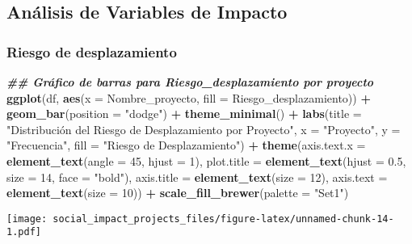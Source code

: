 \documentclass[
]{article}
\newenvironment{Shaded}{\begin{snugshade}}{\end{snugshade}}
\newcommand{\AttributeTok}[1]{\textcolor[rgb]{0.13,0.29,0.53}{#1}}
\newcommand{\DecValTok}[1]{\textcolor[rgb]{0.00,0.00,0.81}{#1}}
\newcommand{\DocumentationTok}[1]{\textcolor[rgb]{0.56,0.35,0.01}{\textbf{\textit{#1}}}}
\newcommand{\FloatTok}[1]{\textcolor[rgb]{0.00,0.00,0.81}{#1}}
\newcommand{\FunctionTok}[1]{\textcolor[rgb]{0.13,0.29,0.53}{\textbf{#1}}}
\newcommand{\NormalTok}[1]{#1}
\newcommand{\SpecialCharTok}[1]{\textcolor[rgb]{0.81,0.36,0.00}{\textbf{#1}}}
\newcommand{\StringTok}[1]{\textcolor[rgb]{0.31,0.60,0.02}{#1}}
\begin{document}
\subsection{\texorpdfstring{\textbf{Análisis de Variables de
Impacto}}{Análisis de Variables de Impacto}}\label{anuxe1lisis-de-variables-de-impacto}

\subsubsection{\texorpdfstring{\textbf{Riesgo de
desplazamiento}}{Riesgo de desplazamiento}}\label{riesgo-de-desplazamiento}

\begin{Shaded}
\begin{Highlighting}[]
\DocumentationTok{\#\# Gráfico de barras para Riesgo\_desplazamiento por proyecto}
\FunctionTok{ggplot}\NormalTok{(df, }\FunctionTok{aes}\NormalTok{(}\AttributeTok{x =}\NormalTok{ Nombre\_proyecto, }\AttributeTok{fill =}\NormalTok{ Riesgo\_desplazamiento)) }\SpecialCharTok{+}
  \FunctionTok{geom\_bar}\NormalTok{(}\AttributeTok{position =} \StringTok{"dodge"}\NormalTok{) }\SpecialCharTok{+}
  \FunctionTok{theme\_minimal}\NormalTok{() }\SpecialCharTok{+}
  \FunctionTok{labs}\NormalTok{(}\AttributeTok{title =} \StringTok{"Distribución del Riesgo de Desplazamiento por Proyecto"}\NormalTok{,}
       \AttributeTok{x =} \StringTok{"Proyecto"}\NormalTok{, }\AttributeTok{y =} \StringTok{"Frecuencia"}\NormalTok{, }\AttributeTok{fill =} \StringTok{"Riesgo de Desplazamiento"}\NormalTok{) }\SpecialCharTok{+}
  \FunctionTok{theme}\NormalTok{(}\AttributeTok{axis.text.x =} \FunctionTok{element\_text}\NormalTok{(}\AttributeTok{angle =} \DecValTok{45}\NormalTok{, }\AttributeTok{hjust =} \DecValTok{1}\NormalTok{), }
        \AttributeTok{plot.title =} \FunctionTok{element\_text}\NormalTok{(}\AttributeTok{hjust =} \FloatTok{0.5}\NormalTok{, }\AttributeTok{size =} \DecValTok{14}\NormalTok{, }\AttributeTok{face =} \StringTok{"bold"}\NormalTok{),}
        \AttributeTok{axis.title =} \FunctionTok{element\_text}\NormalTok{(}\AttributeTok{size =} \DecValTok{12}\NormalTok{),}
        \AttributeTok{axis.text =} \FunctionTok{element\_text}\NormalTok{(}\AttributeTok{size =} \DecValTok{10}\NormalTok{)) }\SpecialCharTok{+}
  \FunctionTok{scale\_fill\_brewer}\NormalTok{(}\AttributeTok{palette =} \StringTok{"Set1"}\NormalTok{)}
\end{Highlighting}
\end{Shaded}

\texttt{[image: social\_impact\_projects\_files/figure-latex/unnamed-chunk-14-1.pdf]}
\end{document}

